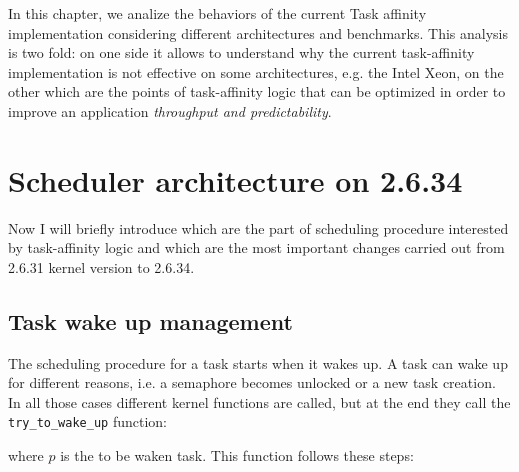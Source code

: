 In this chapter, we analize the behaviors of the current Task affinity
implementation considering different architectures and benchmarks.  This
analysis is two fold: on one side it allows to understand why the current
task-affinity implementation is not effective on some architectures, e.g. the
Intel Xeon, on the other which are the points of task-affinity logic that can be
optimized in order to improve an application \emph{throughput and
predictability}.

\section{Scheduler architecture on 2.6.34}

Now I will briefly introduce which are the part of scheduling procedure 
interested by task-affinity logic and which are the most important changes 
carried out from 2.6.31 kernel version to 2.6.34.

\subsection{Task wake up management}

The scheduling procedure for a task starts when it wakes up. A task can wake up
for different reasons, i.e. a semaphore becomes unlocked or a new task creation.  In all those cases different
kernel functions are called, but at the end they call the
\texttt{try\_to\_wake\_up} function:

\lstset{basicstyle=\footnotesize, language=c, captionpos=b, frame=single, label=lis:APIttwu}


where $p$ is the to be waken task.
This function follows these steps:

